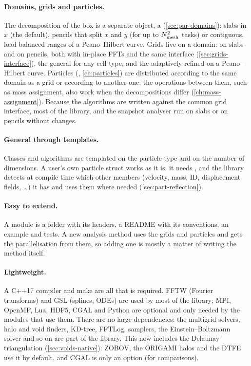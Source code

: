 \paragraph*{Domains, grids and particles.} The decomposition of the box is a separate object, a 
(\cref{sec:par-domains}): slabs in $x$ (the default), pencils that split $x$ and $y$ (for up to $N_{\rm mesh}^2$ tasks)
or contiguous, load-balanced ranges of a Peano--Hilbert curve. Grids live on a domain:  on slabs and
 on pencils, both with in-place FFTs and the same interface (\cref{sec:grids-interface}), the general
 for any cell type, and the adaptively refined  on a Peano--Hilbert curve.
Particles (, \cref{ch:particles}) are distributed according to the same domain as a grid or according
to another one; the operations between them, such as mass assignment, also work when the decompositions differ
(\cref{ch:mass-assignment}). Because the algorithms are written against the common grid interface, most of the
library,  and the snapshot analyser run on slabs or on pencils without changes.

\paragraph*{General through templates.} Classes and algorithms are templated on the particle type and on the number of
dimensions. A user's own particle struct works as it is: it needs , and the library detects at compile
time which other members (velocity, mass, ID, displacement fields, \ldots) it has and uses them where needed
(\cref{sec:part-reflection}).

\paragraph*{Easy to extend.} A module is a folder with its headers, a README with its conventions, an example and
tests. A new analysis method uses the grids and particles and gets the parallelisation from them, so adding one is
mostly a matter of writing the method itself.

\paragraph*{Lightweight.} A C++17 compiler and make are all that is required. FFTW (Fourier transforms) and GSL
(splines, ODEs) are used by most of the library; MPI, OpenMP, Lua, HDF5, CGAL and Python are optional and only needed
by the modules that use them. There are no large dependencies: the multigrid solvers, halo and void finders, KD-tree,
FFTLog, samplers, the Einstein--Boltzmann solver and so on are part of the library. This now includes the Delaunay
triangulation (\cref{sec:voids-native}): ZOBOV, the ORIGAMI halos and the DTFE use it by default, and CGAL is only an
option (for comparisons).

